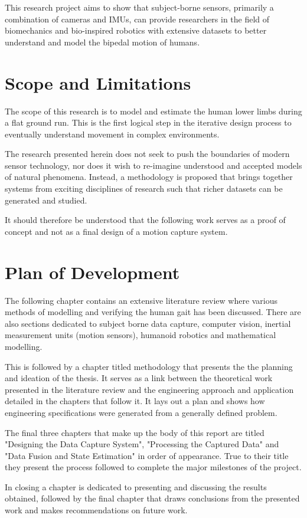 This research project aims to show that subject-borne sensors, primarily a combination of cameras and IMUs, can provide researchers in the field of biomechanics and bio-inspired robotics with extensive datasets to better understand and model the bipedal motion of humans. 

\section{Scope and Limitations}
The scope of this research is to model and estimate the human lower limbs during a flat ground run. This is the first logical step in the iterative design process to eventually understand movement in complex environments.

The research presented herein does not seek to push the boundaries of modern sensor technology, nor does it wish to re-imagine understood and accepted models of natural phenomena. Instead, a methodology is proposed that brings together systems from exciting disciplines of research such that richer datasets can be generated and studied.

It should therefore be understood that the following work serves as a proof of concept and not as a final design of a motion capture system.  
  

  
\section{Plan of Development}
The following chapter contains an extensive literature review where various methods of modelling and verifying the human gait has been discussed. There are also sections dedicated to subject borne data capture, computer vision, inertial measurement units (motion sensors), humanoid robotics and mathematical modelling.

This is followed by a chapter titled methodology that presents the the planning and ideation of the thesis. It serves as a link between the theoretical work presented in the literature review and the engineering approach and application detailed in the chapters that follow it. It lays out a plan and shows how engineering specifications were generated from a generally defined problem. 

The final three chapters that make up the body of this report are titled "Designing the Data Capture System", "Processing the Captured Data" and "Data Fusion and State Estimation" in order of appearance. True to their title they present the process followed to complete the major milestones of the project.

In closing a chapter is dedicated to presenting and discussing the results obtained, followed by the final chapter that draws conclusions from the presented work and makes recommendations on future work. 


 


